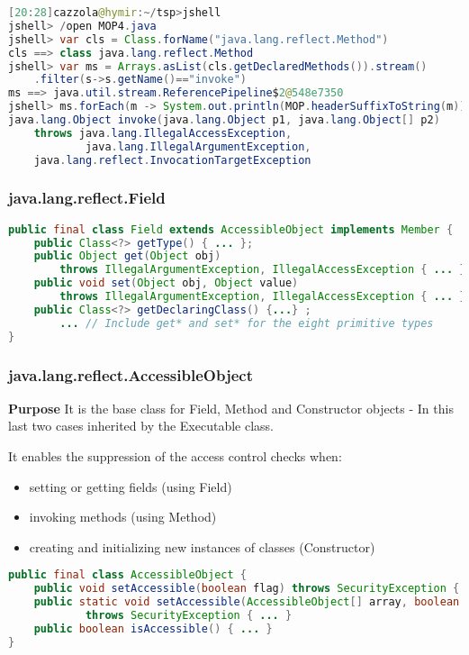 \begin{lstlisting}[language=Java]
[20:28]cazzola@hymir:~/tsp>jshell
jshell> /open MOP4.java
jshell> var cls = Class.forName("java.lang.reflect.Method")
cls ==> class java.lang.reflect.Method
jshell> var ms = Arrays.asList(cls.getDeclaredMethods()).stream()
	.filter(s->s.getName()=="invoke")
ms ==> java.util.stream.ReferencePipeline$2@548e7350
jshell> ms.forEach(m -> System.out.println(MOP.headerSuffixToString(m)))
java.lang.Object invoke(java.lang.Object p1, java.lang.Object[] p2)
	throws java.lang.IllegalAccessException,
			java.lang.IllegalArgumentException,
	java.lang.reflect.InvocationTargetException
\end{lstlisting}

\subsubsection{java.lang.reflect.Field}

\begin{lstlisting}[language=Java]
public final class Field extends AccessibleObject implements Member {
	public Class<?> getType() { ... };
	public Object get(Object obj)
		throws IllegalArgumentException, IllegalAccessException { ... };
	public void set(Object obj, Object value)
		throws IllegalArgumentException, IllegalAccessException { ... };
	public Class<?> getDeclaringClass() {...} ;
		... // Include get* and set* for the eight primitive types
}
\end{lstlisting}

\subsubsection{java.lang.reflect.AccessibleObject}

\textbf{Purpose}
It is the base class for Field, Method and Constructor objects
	- In this last two cases inherited by the Executable class.

It enables the suppression of the access control checks when:
\begin{itemize}
	\item setting or getting fields (using Field)
	\item invoking methods (using Method)
	\item  creating and initializing new instances of classes (Constructor)
\end{itemize}

\begin{lstlisting}[language=Java]
public final class AccessibleObject {
	public void setAccessible(boolean flag) throws SecurityException { ... }
	public static void setAccessible(AccessibleObject[] array, boolean flag)
			throws SecurityException { ... }
	public boolean isAccessible() { ... }
}
\end{lstlisting}

